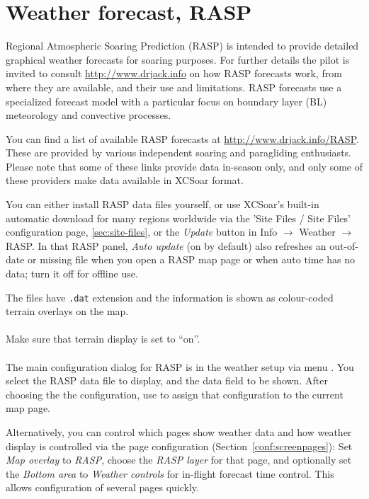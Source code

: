 \section{Weather forecast, RASP}\label{sec:weather-forecast}

Regional Atmospheric Soaring Prediction (RASP) is intended to provide
detailed graphical weather forecasts for soaring purposes. For further details 
the pilot is invited to consult \url{http://www.drjack.info} on how RASP 
forecasts work, from where they are available, and their use and limitations. 
RASP forecasts use a specialized forecast model with a particular focus on
boundary layer (BL) meteorology and convective processes.

You can find a list of available RASP forecasts at \url{http://www.drjack.info/RASP}.
These are provided by various independent soaring and paragliding enthusiasts. 
Please note that some of these links provide data in-season only, and only some
of these providers make data available in XCSoar format.

You can either install RASP data files yourself, or use XCSoar's built-in automatic
download for many regions worldwide via the 'Site Files / Site Files'
configuration page, \ref{sec:site-files}, or the \emph{Update} button in
Info $\rightarrow$ Weather $\rightarrow$ RASP.  In that RASP panel,
\emph{Auto update} (on by default) also refreshes an out-of-date or missing
file when you open a RASP map page or when auto time has no data; turn it
off for offline use. 

The files have \verb|.dat| extension and the information is shown 
as colour-coded terrain overlays on the map.  \\ \\
Make sure that terrain display is set to ``on''. \tip{}  \\ \\

The main configuration dialog for RASP is in the weather setup via menu
.
You select the RASP data file to display, and the data field to be shown.
After choosing the the configuration, use  to 
assign that configuration to the current map page.

Alternatively, you can control which pages show weather data and how weather display
is controlled via the page configuration (Section~\ref{conf:screenpages}):
Set \emph{Map overlay} to \emph{RASP},
choose the \emph{RASP layer} for that page, and optionally set the
\emph{Bottom area} to \emph{Weather controls} for in-flight forecast time
control. This allows configuration of several pages quickly.

